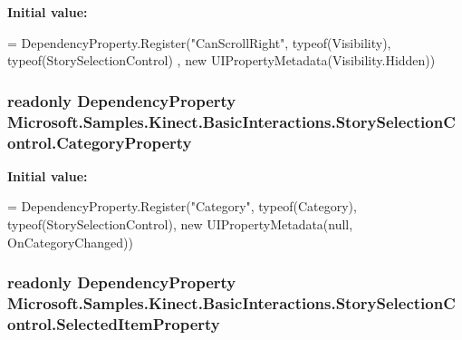 {\bfseries Initial value\-:}
\begin{DoxyCode}
=
            DependencyProperty.Register(\textcolor{stringliteral}{"CanScrollRight"}, typeof(Visibility), typeof(StorySelectionControl)
      , \textcolor{keyword}{new} UIPropertyMetadata(Visibility.Hidden))
\end{DoxyCode}
\hypertarget{class_microsoft_1_1_samples_1_1_kinect_1_1_basic_interactions_1_1_story_selection_control_a9960817e3e69b392de1953833811677c}{
\subsubsection[{Category\-Property}]{\setlength{\rightskip}{0pt plus 5cm}readonly Dependency\-Property Microsoft.\-Samples.\-Kinect.\-Basic\-Interactions.\-Story\-Selection\-Control.\-Category\-Property\hspace{0.3cm}{\ttfamily [static]}}}\label{class_microsoft_1_1_samples_1_1_kinect_1_1_basic_interactions_1_1_story_selection_control_a9960817e3e69b392de1953833811677c}
{\bfseries Initial value\-:}
\begin{DoxyCode}
=
            DependencyProperty.Register(\textcolor{stringliteral}{"Category"}, typeof(Category), typeof(StorySelectionControl), \textcolor{keyword}{new} 
      UIPropertyMetadata(null, OnCategoryChanged))
\end{DoxyCode}
\hypertarget{class_microsoft_1_1_samples_1_1_kinect_1_1_basic_interactions_1_1_story_selection_control_a0bf7deb3f042e5a3382549b7540f57e4}{
\subsubsection[{Selected\-Item\-Property}]{\setlength{\rightskip}{0pt plus 5cm}readonly Dependency\-Property Microsoft.\-Samples.\-Kinect.\-Basic\-Interactions.\-Story\-Selection\-Control.\-Selected\-Item\-Property\hspace{0.3cm}{\ttfamily [static]}}}\label{class_microsoft_1_1_samples_1_1_kinect_1_1_basic_interactions_1_1_story_selection_control_a0bf7deb3f042e5a3382549b7540f57e4}
